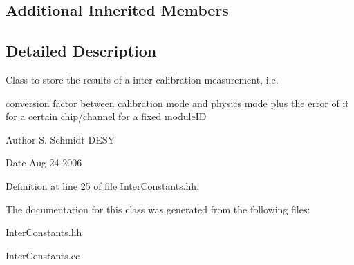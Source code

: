 \subsection*{Additional Inherited Members}


\subsection{Detailed Description}
Class to store the results of a inter calibration measurement, i.\-e. 

conversion factor between calibration mode and physics mode plus the error of it for a certain chip/channel for a fixed module\-I\-D \begin{DoxyAuthor}{Author}
S. Schmidt D\-E\-S\-Y 
\end{DoxyAuthor}
\begin{DoxyDate}{Date}
Aug 24 2006 
\end{DoxyDate}


Definition at line 25 of file Inter\-Constants.\-hh.



The documentation for this class was generated from the following files\-:\begin{DoxyCompactItemize}
\item 
Inter\-Constants.\-hh\item 
Inter\-Constants.\-cc\end{DoxyCompactItemize}
